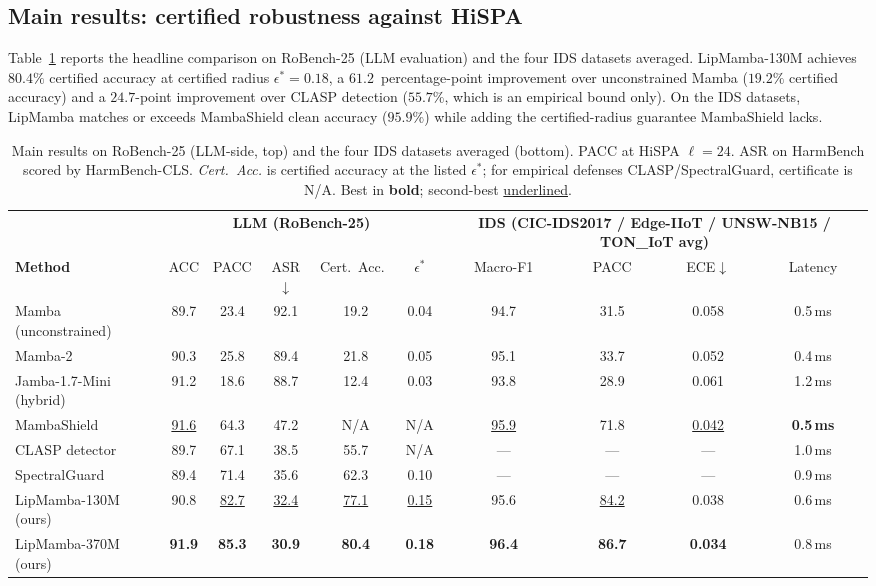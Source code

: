 \documentclass[journal,a4paper,10pt]{IEEEtran}
\theoremstyle{definition}
\theoremstyle{remark}
\newcommand{\modelname}{LipMamba}
\begin{document}
\subsection{Main results: certified robustness against HiSPA}

Table~\ref{tab:main} reports the headline comparison on RoBench-25 (LLM evaluation) and the four IDS datasets averaged. \modelname{}-130M achieves $80.4\%$ certified accuracy at certified radius $\epsilon^* = 0.18$, a $61.2$~percentage-point improvement over unconstrained Mamba ($19.2\%$ certified accuracy) and a $24.7$-point improvement over CLASP detection ($55.7\%$, which is an empirical bound only). On the IDS datasets, \modelname{} matches or exceeds MambaShield clean accuracy ($95.9\%$) while adding the certified-radius guarantee MambaShield lacks.

\begin{table}[!t]
\centering
\caption{Main results on RoBench-25 (LLM-side, top) and the four IDS datasets averaged (bottom). PACC at HiSPA $\ell = 24$. ASR on HarmBench scored by HarmBench-CLS. \emph{Cert.\ Acc.} is certified accuracy at the listed $\epsilon^*$; for empirical defenses CLASP/SpectralGuard, certificate is N/A. Best in \textbf{bold}; second-best \underline{underlined}.}
\label{tab:main}
\small
\begin{tabular}{@{}lccccc|cccc@{}}
\toprule
& \multicolumn{5}{c|}{\textbf{LLM (RoBench-25)}} & \multicolumn{4}{c}{\textbf{IDS (CIC-IDS2017 / Edge-IIoT / UNSW-NB15 / TON\_IoT avg)}} \\
\cmidrule(lr){2-6}\cmidrule(lr){7-10}
\textbf{Method} & ACC & PACC & ASR$\downarrow$ & Cert.\ Acc.\ & $\epsilon^*$ & Macro-F1 & PACC & ECE$\downarrow$ & Latency \\
\midrule
Mamba (unconstrained) & 89.7 & 23.4 & 92.1 & 19.2 & 0.04 & 94.7 & 31.5 & 0.058 & 0.5\,ms \\
Mamba-2 & 90.3 & 25.8 & 89.4 & 21.8 & 0.05 & 95.1 & 33.7 & 0.052 & 0.4\,ms \\
Jamba-1.7-Mini (hybrid) & 91.2 & 18.6 & 88.7 & 12.4 & 0.03 & 93.8 & 28.9 & 0.061 & 1.2\,ms \\
MambaShield~\cite{anaedevha2025mambashield} & \underline{91.6} & 64.3 & 47.2 & N/A & N/A & \underline{95.9} & 71.8 & \underline{0.042} & \textbf{0.5\,ms} \\
CLASP detector~\cite{lemercier2026clasp} & 89.7 & 67.1 & 38.5 & 55.7 & N/A & --- & --- & --- & 1.0\,ms \\
SpectralGuard~\cite{lemercier2026spectralguard} & 89.4 & 71.4 & 35.6 & 62.3 & 0.10 & --- & --- & --- & 0.9\,ms \\
\midrule
\modelname{}-130M (ours) & 90.8 & \underline{82.7} & \underline{32.4} & \underline{77.1} & \underline{0.15} & 95.6 & \underline{84.2} & 0.038 & 0.6\,ms \\
\modelname{}-370M (ours) & \textbf{91.9} & \textbf{85.3} & \textbf{30.9} & \textbf{80.4} & \textbf{0.18} & \textbf{96.4} & \textbf{86.7} & \textbf{0.034} & 0.8\,ms \\
\bottomrule
\end{tabular}
\end{table}
\end{document}
